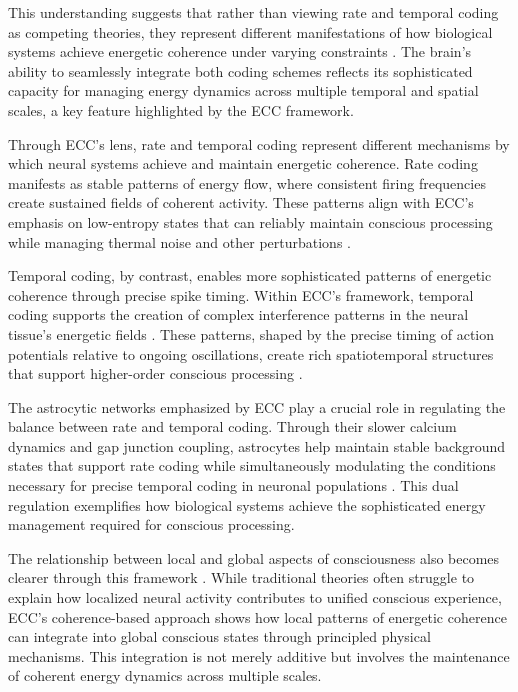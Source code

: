 This understanding suggests that rather than viewing rate and temporal coding as competing theories, they represent different manifestations of how biological systems achieve energetic coherence under varying constraints \cite{fell2011role}. The brain's ability to seamlessly integrate both coding schemes reflects its sophisticated capacity for managing energy dynamics across multiple temporal and spatial scales, a key feature highlighted by the ECC framework.

Through ECC's lens, rate and temporal coding represent different mechanisms by which neural systems achieve and maintain energetic coherence. Rate coding manifests as stable patterns of energy flow, where consistent firing frequencies create sustained fields of coherent activity. These patterns align with ECC's emphasis on low-entropy states that can reliably maintain conscious processing while managing thermal noise and other perturbations \cite{wang2010neurophysiological}.

Temporal coding, by contrast, enables more sophisticated patterns of energetic coherence through precise spike timing. Within ECC's framework, temporal coding supports the creation of complex interference patterns in the neural tissue's energetic fields \cite{adhikari2010cross}. These patterns, shaped by the precise timing of action potentials relative to ongoing oscillations, create rich spatiotemporal structures that support higher-order conscious processing \cite{buzsaki2004neuronal}.

The astrocytic networks emphasized by ECC play a crucial role in regulating the balance between rate and temporal coding. Through their slower calcium dynamics and gap junction coupling, astrocytes help maintain stable background states that support rate coding while simultaneously modulating the conditions necessary for precise temporal coding in neuronal populations \cite{honey2012slow}. This dual regulation exemplifies how biological systems achieve the sophisticated energy management required for conscious processing.

The relationship between local and global aspects of consciousness also becomes clearer through this framework \cite{singer1999neuronal}. While traditional theories often struggle to explain how localized neural activity contributes to unified conscious experience, ECC's coherence-based approach shows how local patterns of energetic coherence can integrate into global conscious states through principled physical mechanisms. This integration is not merely additive but involves the maintenance of coherent energy dynamics across multiple scales.

